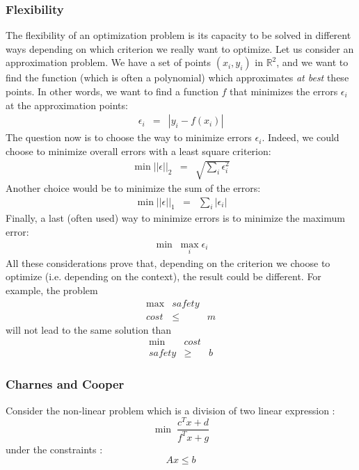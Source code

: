 \subsubsection{Flexibility}
The flexibility of an optimization problem is its capacity to be solved in different ways depending on which criterion we really want to optimize. Let us consider an approximation problem. We have a set of points $(x_i,y_i)$ in $\mathbb{R}^2$, and we want to find the function (which is often a polynomial) which approximates \textit{at best} these points. In other words, we want to find a function $f$ that minimizes the errors $\epsilon _i$ at the approximation points:
\begin{eqnarray*}
\epsilon_i &=& |y_i - f(x_i)|
\end{eqnarray*}
The question now is to choose the way to minimize errors $\epsilon _i$. Indeed, we could choose to minimize overall errors with a least square criterion: 
\begin{eqnarray*}
\min ||\epsilon||_2 &=& \sqrt{\sum_i{\epsilon_i^2}}
\end{eqnarray*}
Another choice would be to minimize the sum of the errors:
\begin{eqnarray*}
\min ||\epsilon||_1 &=& \sum_i{|\epsilon_i|}
\end{eqnarray*}
Finally, a last (often used) way to minimize errors is to minimize the maximum error: 
\begin{eqnarray*}
\min\;\max_i \epsilon_i
\end{eqnarray*}
All these considerations prove that, depending on the criterion we choose to optimize (i.e. depending on the context), the result could be different. For example, the problem
\begin{eqnarray*}
\max &safety&\\
cost &\le& m
\end{eqnarray*}
will not lead to the same solution than
\begin{eqnarray*}
\min &cost&\\
safety &\ge& b
\end{eqnarray*}

\subsubsection{Charnes and Cooper}

Consider the non-linear problem which is a division of two linear expression : 
$$ \min \; \frac{c^{T}x + d}{f^{T}x + g}$$
under the constraints : 
$$ Ax \leq b$$

